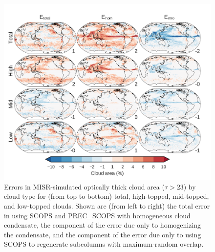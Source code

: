 \begin{figure}[htbp]
\centering
\includegraphics{graphics/subgrid1_cldmisrthick_maps_diff.pdf}
\caption{\label{fig:cldmisrThickMapsMroDiff}Errors in MISR-simulated
optically thick cloud area (\(\tau > 23\)) by cloud type for (from top
to bottom) total, high-topped, mid-topped, and low-topped clouds. Shown
are (from left to right) the total error in using SCOPS and PREC\_SCOPS
with homogeneous cloud condensate, the component of the error due only
to homogenizing the condensate, and the component of the error due only
to using SCOPS to regenerate subcolumns with maximum-random
overlap.}\label{fig:cldmisrThickMapsMroDiff}
\end{figure}

